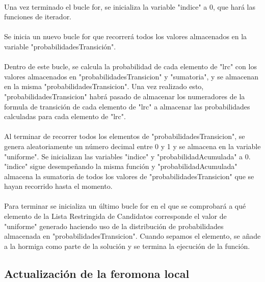 	\paragraph{}Una vez terminado el bucle for, se inicializa la variable "indice" a 0, que hará las funciones de iterador.
	
	\paragraph{}Se inicia un nuevo bucle for que recorrerá todos los valores almacenados en la variable "probabilidadesTransición".
	
	\paragraph{}Dentro de este bucle, se calcula la probabilidad de cada elemento de "lrc" con los valores almacenados en "probabilidadesTransicion" y "sumatoria", y se almacenan en la misma "probabilidadesTransicion". Una vez realizado esto, "probabilidadesTransicion" habrá pasado de almacenar los numeradores de la formula de transición de cada elemento de "lrc" a almacenar las probabilidades calculadas para cada elemento de "lrc".
	
	\paragraph{}Al terminar de recorrer todos los elementos de "probabilidadesTransicion", se genera aleatoriamente un número decimal entre 0 y 1 y se almacena en la variable "uniforme". Se inicializan las variables "indice" y "probabilidadAcumulada" a 0. "indice" sigue desempeñando la misma función y "probabilidadAcumulada" almacena la sumatoria de todos los valores de "probabilidadesTransicion" que se hayan recorrido hasta el momento.
	
	\paragraph{}Para terminar se inicializa un último bucle for en el que se comprobará a qué elemento de la Lista Restringida de Candidatos corresponde el valor de "uniforme" generado haciendo uso de la distribución de probabilidades almacenada en "probabilidadesTransicion". Cuando sepamos el elemento, se añade a la hormiga como parte de la solución y se termina la ejecución de la función.
	
	\subsection{Actualización de la feromona local}
	
